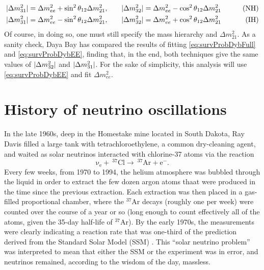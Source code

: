 \documentclass[../thesis.tex]{subfiles}
\begin{document}
\begin{align*}
  \lvert \Delta m^2_{31}\rvert = \Delta m^2_{ee} + \sin^2 \theta_{12} \Delta m^2_{21}, \qquad
  & \lvert \Delta m^2_{32}\rvert = \Delta m^2_{ee} - \cos^2 \theta_{12} \Delta m^2_{21} \qquad
  & \text{(NH)}\\
  \lvert \Delta m^2_{31}\rvert = \Delta m^2_{ee} - \sin^2 \theta_{12} \Delta m^2_{21}, \qquad
  & \lvert \Delta m^2_{32}\rvert = \Delta m^2_{ee} + \cos^2 \theta_{12} \Delta m^2_{21} \qquad
  & \text{(IH)}
\end{align*}
Of course, in doing so, one must still specify the mass hierarchy and \(\Delta m^2_{21}.\) As a sanity check, Daya Bay has compared the results of fitting \eqref{eq:survProbDybFull} and \eqref{eq:survProbDybEE}, finding that, in the end, both techniques give the same values of \(\lvert \Delta m^2_{32}\rvert\) and \(\lvert \Delta m^2_{31}\rvert\). For the sake of simplicity, this analysis will use \eqref{eq:survProbDybEE} and fit \(\Delta m^2_{ee}\).

\section{History of neutrino oscillations}
\label{sec:history}

In the late 1960s, deep in the Homestake mine located in South Dakota, Ray Davis filled a large tank with tetrachloroethylene, a common dry-cleaning agent, and waited as solar neutrinos interacted with chlorine-37 atoms via the reaction
\begin{equation*}
  \mathrm{\nu_e + \ ^{37}Cl \longrightarrow \ ^{37}Ar + e^-.}  
\end{equation*}
Every few weeks, from 1970 to 1994, the helium atmosphere was bubbled through the liquid in order to extract the few dozen argon atoms thaat were produced in the time since the previous extraction. Each extraction was then placed in a gas-filled proportional chamber, where the $^{37}$Ar decays (roughly one per week) were counted over the course of a year or so (long enough to count effectively all of the atoms, given the 35-day half-life of $^{37}$Ar). By the early 1970s, the measurements were clearly indicating a reaction rate that was one-third of the prediction derived from the Standard Solar Model (SSM) \cite{DAVIS199413}. This ``solar neutrino problem'' was interpreted to mean that either the SSM or the experiment was in error, and neutrinos remained, according to the wisdom of the day, massless.
\end{document}
